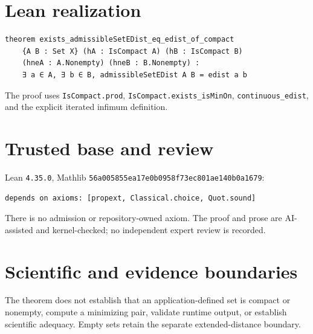 \documentclass[11pt]{article}
\begin{document}
\section{Lean realization}
\begin{lstlisting}
theorem exists_admissibleSetEDist_eq_edist_of_compact
    {A B : Set X} (hA : IsCompact A) (hB : IsCompact B)
    (hneA : A.Nonempty) (hneB : B.Nonempty) :
    ∃ a ∈ A, ∃ b ∈ B, admissibleSetEDist A B = edist a b
\end{lstlisting}
The proof uses \texttt{IsCompact.prod}, \texttt{IsCompact.exists\_isMinOn},
\texttt{continuous\_edist}, and the explicit iterated infimum definition.
\section{Trusted base and review}
Lean \texttt{4.35.0}, Mathlib
\texttt{56a005855ea17e0b0958f73ec801ae140b0a1679}:
\begin{lstlisting}
depends on axioms: [propext, Classical.choice, Quot.sound]
\end{lstlisting}
There is no admission or repository-owned axiom. The proof and prose are AI-assisted and
kernel-checked; no independent expert review is recorded.
\section{Scientific and evidence boundaries}
The theorem does not establish that an application-defined set is compact or nonempty,
compute a minimizing pair, validate runtime output, or establish scientific adequacy.
Empty sets retain the separate extended-distance boundary.
\end{document}
